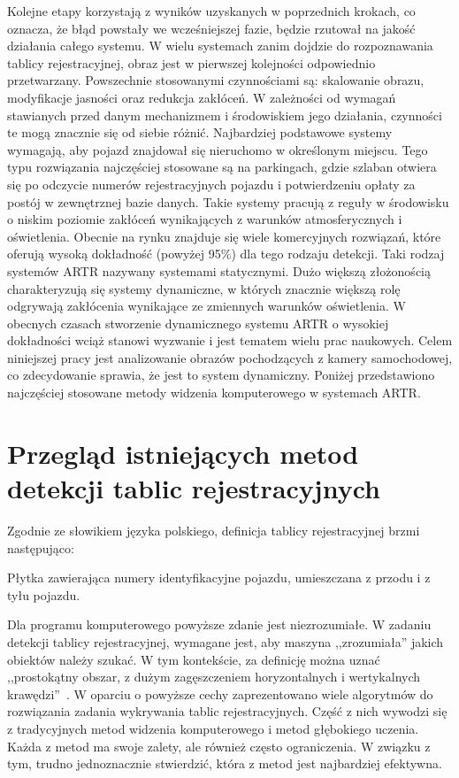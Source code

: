 \FloatBarrier
Kolejne etapy korzystają z wyników uzyskanych w poprzednich krokach, co oznacza, że błąd powstały we wcześniejszej fazie, będzie rzutował na jakość działania całego systemu.
W wielu systemach zanim dojdzie do rozpoznawania tablicy rejestracyjnej, obraz jest w pierwszej kolejności odpowiednio przetwarzany.
Powszechnie stosowanymi czynnościami są: skalowanie obrazu, modyfikacje jasności oraz redukcja zakłóceń.
W zależności od wymagań stawianych przed danym mechanizmem i środowiskiem jego działania, czynności te mogą znacznie się od siebie różnić.
Najbardziej podstawowe systemy wymagają, aby pojazd znajdował się nieruchomo w określonym miejscu.
Tego typu rozwiązania najczęściej stosowane są na parkingach, gdzie szlaban otwiera się po odczycie numerów rejestracyjnych pojazdu i potwierdzeniu opłaty za postój w zewnętrznej bazie danych.
Takie systemy pracują z reguły w środowisku o niskim poziomie zakłóceń wynikających z warunków atmosferycznych i oświetlenia.
Obecnie na rynku znajduje się wiele komercyjnych rozwiązań, które oferują wysoką dokładność (powyżej 95\%) dla tego rodzaju detekcji.
Taki rodzaj systemów ARTR nazywany systemami statycznymi.
Dużo większą złożonością charakteryzują się systemy dynamiczne, w których znacznie większą rolę odgrywają zakłócenia wynikające ze zmiennych warunków oświetlenia.
W obecnych czasach stworzenie dynamicznego systemu ARTR o wysokiej dokładności wciąż stanowi wyzwanie i jest tematem wielu prac naukowych.
Celem niniejszej pracy jest analizowanie obrazów pochodzących z kamery samochodowej, co zdecydowanie sprawia, że jest to system dynamiczny.
Poniżej przedstawiono najczęściej stosowane metody widzenia komputerowego w systemach ARTR\@.


\section{Przegląd istniejących metod detekcji tablic rejestracyjnych}

Zgodnie ze słowikiem języka polskiego, definicja tablicy rejestracyjnej brzmi następująco:
\begin{definition}
    Płytka zawierająca numery identyfikacyjne pojazdu, umieszczana z przodu i z tyłu pojazdu.
\end{definition}
Dla programu komputerowego powyższe zdanie jest niezrozumiałe.
W zadaniu detekcji tablicy rejestracyjnej, wymagane jest, aby maszyna ,,zrozumiała'' jakich obiektów należy szukać.
W tym kontekście, za definicję można uznać ,,prostokątny obszar, z dużym zagęszczeniem horyzontalnych i wertykalnych krawędzi''~\cite{824138}.
W oparciu o powyższe cechy zaprezentowano wiele algorytmów do rozwiązania zadania wykrywania tablic rejestracyjnych.
Część z nich wywodzi się z tradycyjnych metod widzenia komputerowego i metod głębokiego uczenia.
Każda z metod ma swoje zalety, ale również często ograniczenia.
W związku z tym, trudno jednoznacznie stwierdzić, która z metod jest najbardziej efektywna.


